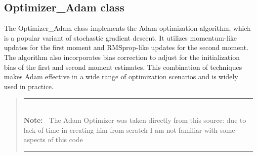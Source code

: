 \documentclass{article}
\newlength{\Lnote}
\newcommand{\notte}[1]
     {\addtolength{\leftmargini}{4em}
        \settowidth{\Lnote}{\textbf{Note:~}}
        \begin{quote}
            \rule{\dimexpr\textwidth-2\leftmargini}{1pt}\\
                        \mbox{}\hspace{-\Lnote}\textbf{Note:~}%
                                            #1\\[-0.5ex] 
            \rule{\dimexpr\textwidth-2\leftmargini}{1pt}
        \end{quote}
        \addtolength{\leftmargini}{-4em}}
\begin{document}
\subsection{Optimizer\_Adam class}
The Optimizer\_Adam class implements the Adam optimization algorithm, which is a popular variant of stochastic gradient descent. It utilizes momentum-like updates for the first moment and RMSprop-like updates for the second moment. The algorithm also incorporates bias correction to adjust for the initialization bias of the first and second moment estimates. This combination of techniques makes Adam effective in a wide range of optimization scenarios and is widely used in practice.

\notte{The Adam Optimizer was taken directly from this source:  \cite{nnfs} due to lack of time in creating him from scratch I am not familiar with some aspects of this code }
\end{document}
